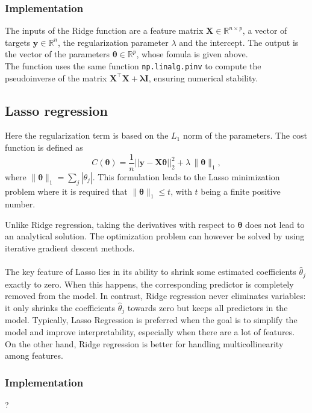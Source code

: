 \documentclass[
    article
 reprint,            %
 amsmath,amssymb,
 aps,
]{revtex4-2}
\begin{document}
\subsubsection{Implementation}
The inputs of the Ridge function are a feature matrix $\mathbf{X} \in \mathbb{R}^{n \times p}$, a vector of targets $\mathbf{y} \in \mathbb{R}^n$, the regularization parameter $\lambda$ and the intercept. The output is the vector of the parameters $\boldsymbol{\theta} \in \mathbb{R}^{p}$, whose fomula is given above.\\
The function uses the same function \texttt{np.linalg.pinv} to compute the pseudoinverse of the matrix $\mathbf{X}^\top \mathbf{X} + \boldsymbol{\lambda}\mathbf{I}$, ensuring numerical stability.

\subsection{Lasso regression}
Here the regularization term is based on the $L_1$ norm of the parameters\cite{hjorthjensen_week35}.
The cost function is defined as
$$
C(\boldsymbol{\theta}) 
= \frac{1}{n}\vert\vert \boldsymbol{y}-\boldsymbol{X}\boldsymbol{\theta}\vert\vert_2^2
+ \lambda \, \|\boldsymbol{\theta}\|_1,
$$
where $\|\boldsymbol{\theta}\|_1 = \sum_{j}|\theta_j|$.  
This formulation leads to the Lasso minimization problem where it is required that $\|\boldsymbol{\theta}\|_1 \leq t$, with $t$ being a finite positive number. 

Unlike Ridge regression, taking the derivatives with respect to $\boldsymbol{\theta}$ does not lead to an analytical solution. 
The optimization problem can however be solved by using iterative gradient descent methods.\\ \\
The key feature of Lasso lies in its ability to shrink some estimated coefficients $\hat{\theta}_j$ exactly to zero. 
When this happens, the corresponding predictor is completely removed from the model.  
In contrast, Ridge regression never eliminates variables: it only shrinks the coefficients $\hat{\theta}_j$ towards zero but keeps all predictors in the model.
Typically, Lasso Regression is preferred when the goal is to simplify the model and improve interpretability, especially when there are a lot of features. On the other hand, Ridge regression is better for handling multicollinearity among features. 

\subsubsection{Implementation}
? 
\end{document}
